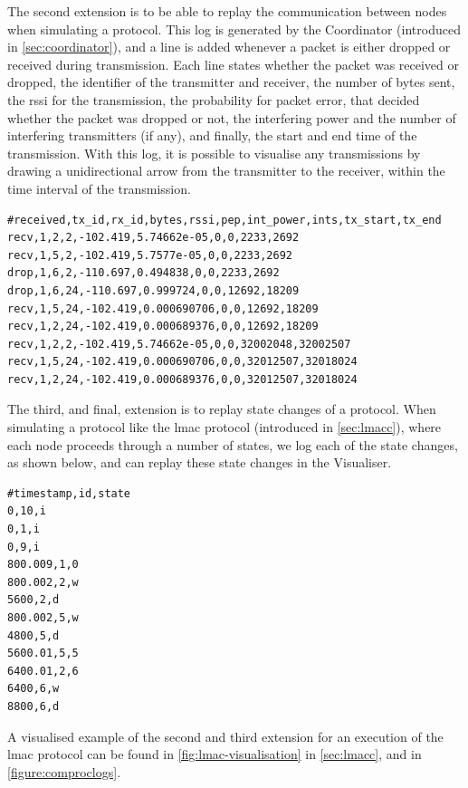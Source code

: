 The second extension is to be able to replay the communication between nodes when simulating a protocol. This
log is generated by the Coordinator (introduced in \autoref{sec:coordinator}), and a line is added whenever a
packet is either dropped or received during transmission. Each line states whether the packet was received
or dropped, the identifier of the transmitter and receiver, the number of bytes sent, the \gls{rssi} for the
transmission, the probability for packet error, that decided whether the packet was dropped or not, the
interfering power and the number of interfering transmitters (if any), and finally, the start and end time of
the transmission. With this log, it is possible to visualise any transmissions by drawing a unidirectional
arrow from the transmitter to the receiver, within the time interval of the transmission.
%
\begin{verbatim}
#received,tx_id,rx_id,bytes,rssi,pep,int_power,ints,tx_start,tx_end
recv,1,2,2,-102.419,5.74662e-05,0,0,2233,2692
recv,1,5,2,-102.419,5.7577e-05,0,0,2233,2692
drop,1,6,2,-110.697,0.494838,0,0,2233,2692
drop,1,6,24,-110.697,0.999724,0,0,12692,18209
recv,1,5,24,-102.419,0.000690706,0,0,12692,18209
recv,1,2,24,-102.419,0.000689376,0,0,12692,18209
recv,1,2,2,-102.419,5.74662e-05,0,0,32002048,32002507
recv,1,5,24,-102.419,0.000690706,0,0,32012507,32018024
recv,1,2,24,-102.419,0.000689376,0,0,32012507,32018024
\end{verbatim}

The third, and final, extension is to replay state changes of a protocol. When simulating a protocol like the
\gls{lmac} protocol (introduced in \autoref{sec:lmacc}), where each node proceeds through a number of states,
we log each of the state changes, as shown below, and can replay these state changes in the Visualiser.
%
\begin{verbatim}
#timestamp,id,state
0,10,i
0,1,i
0,9,i
800.009,1,0
800.002,2,w
5600,2,d
800.002,5,w
4800,5,d
5600.01,5,5
6400.01,2,6
6400,6,w
8800,6,d
\end{verbatim}

A visualised example of the second and third extension for an execution of the \gls{lmac} protocol can be
found in \autoref{fig:lmac-visualisation} in \autoref{sec:lmacc}, and in \autoref{figure:comproclogs}.

